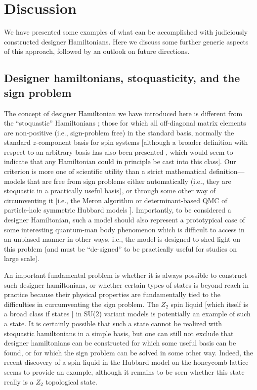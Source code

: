 \documentclass[range]{ar2e}
\begin{document}
\section{Discussion}
\label{sec:discussion}

We have presented some examples of what can be accomplished with judiciously constructed designer Hamiltonians. Here we discuss
some further generic aspects of this approach, followed by an outlook on future directions.

\subsection{Designer hamiltonians, stoquasticity, and the sign problem}

The concept of designer Hamiltonian we have introduced here is different from the ``stoquastic'' Hamiltonians \cite{Terhal08}; 
those for which all off-diagonal matrix elements are non-positive (i.e., sign-problem free) in the standard basis, normally the standard $z$-component 
basis for spin systems [although a broader definition with respect to an arbitrary basis has also been presented \cite{Terhal09}, which would seem to 
indicate that any Hamiltonian could in principle be cast into this class]. Our criterion is more one of scientific utility than a strict mathematical 
definition---models that are free from sign problems either automatically (i.e., they are stoquastic in a practically useful basis), or through some 
other way of circumventing it [i.e., the Meron algorithm \cite{Chandrasekharan99} or determinant-based QMC of particle-hole symmetric Hubbard 
models \cite{White89,Assaad05,Assaad07}]. Importantly, to be considered a designer Hamiltonian, such a model should also represent a prototypical case of 
some interesting quantum-man body phenomenon which is difficult to access in an unbiased manner in other ways, i.e., the model is designed to shed
light on this problem (and must be ``de-signed'' to be practically useful for studies on large scale).

An important fundamental problem is whether it is always possible to construct such designer hamiltonians, or whether certain types of 
states is beyond reach in practice because their physical properties are fundamentally tied to the difficulties in curcumventing the sign problem. 
The $Z_2$ spin liquid [which itself is a broad class if states \cite{Wen03}] in SU($2$) variant models is potentially an example of such a state. 
It is certainly possible that such a state cannot be realized with stoquastic hamiltonians in a simple basis, but one can still not exclude that 
designer hamiltonians can be constructed for which some useful basis can be found, or for which the sign problem can be solved in some other way.
Indeed, the recent discovery of a spin liquid in the Hubbard model on the honeycomb lattice \cite{Meng10} seems to provide an example, although it 
remains to be seen whether this state really is a $Z_2$ topological state.
\end{document}
